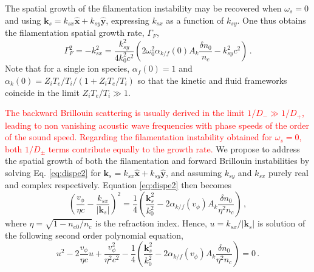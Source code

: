 \documentclass[
 reprint,
 superscriptaddress,
 amsmath,amssymb,
 aps,
]{revtex4-1}
\def\tc{\textcolor{red}}
\begin{document}
The spatial growth of the filamentation instability may be recovered when $\omega_s=0$ and using $\mathbf{k}_s =k_{sx} \hat{\mathbf{x}} + k_{sy} \hat{\mathbf{y}}$, expressing $k_{sx}$ as a function of $k_{sy}$. One thus obtains the filamentation  spatial growth rate,   $\Gamma_F$, 
\begin{equation}\label{eq:gf} 
\Gamma_F^2
=-k_{sx}^2=\frac{k_{sy}^2}{4k_0^2c^2}\left( 2\omega_{0}^2\alpha_{k/f}(0)A_k\frac{\delta n_0}{n_c}- k_{sy}^2c^2 \right) 
\, .
\end{equation}
Note that for a single ion species,  $\alpha_f(0)=1$ and $\alpha_k(0)= Z_iT_e/T_i/(1+Z_iT_e/T_i)$ so that the kinetic and fluid frameworks coincide in the limit $Z_iT_e/T_i\gg 1$.

\tc{
The backward Brillouin scattering is usually  derived in the  limit $1/D_-\gg1/D_+$, leading to non vanishing acoustic wave frequencies  with  phase speeds of the order of the sound speed.
Regarding the filamentation instability obtained for $\omega_s=0$, both $1/D_\pm$ terms contribute equally to the growth rate.
}
We propose to address the spatial growth of both the filamentation and forward Brillouin instabilities  by solving Eq. \eqref{eq:dispe2} for  $\mathbf{k}_s = k_{sx} \hat{\mathbf{x}} +k_{sy} \hat{\mathbf{y}}$, and assuming 
$ k_{sy}$ and $k_{sx}$ purely real and complex  respectively. Equation \eqref{eq:dispe2} then becomes 
\begin{equation}\label{eq:dispe3} 
\left(\frac{v_\phi}{\eta c} - 
\frac{ k_{sx}}{\vert \mathbf{k}_s\vert }\right)^2
=\frac{1}{4} \left( \frac{\mathbf{k}_s^2}{k_0^2} - 2\alpha_{k/f}(v_\phi)A_k\frac{\delta n_0}{\eta^2n_c} \right) 
\, ,
\end{equation}
where $\eta=\sqrt{1-n_{e0}/n_c}$ is the refraction index.
Hence, $u =  k_{sx}/\vert \mathbf{k}_s\vert $ is solution of the following second order polynomial equation, 
\begin{equation}\label{eq:dispe2poly} 
u^2 -2\frac{v_\phi}{\eta c}u +\frac{v_\phi^2}{\eta^2 c^2}-\frac{1}{4}\left( \frac{\mathbf{k}_s^2}{k_0^2} - 2\alpha_{k/f}(v_\phi)A_k\frac{\delta n_0}{\eta^2n_c} \right) =0 
\, .
\end{equation}
\end{document}
